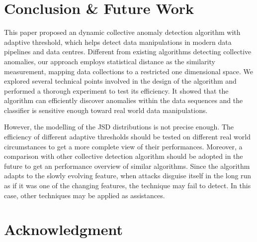 \documentclass[10pt,conference,letterpaper]{IEEEtran}
\begin{document}
	\section{Conclusion \& Future Work}\label{sec:conclusion}
		This paper proposed an dynamic collective anomaly detection algorithm with adaptive threshold, which helps detect data manipulations in modern data pipelines and data centres. Different from existing algorithms detecting collective anomalies, our approach employs statistical distance as the similarity measurement, mapping data collections to a restricted one dimensional space. We explored several technical points involved in the design of the algorithm and performed a thorough experiment to test its efficiency. It showed that the algorithm can efficiently discover anomalies within the data sequences and the classifier is sensitive enough toward real world data manipulations.
		
		However, the modelling of the JSD distributions is not precise enough. The efficiency of different adaptive thresholds should be tested on different real world circumstances to get a more complete view of their performances. Moreover, a comparison with other collective detection algorithm should be adopted in the future to get an performance overview of similar algorithms. Since the algorithm adapts to the slowly evolving feature, when attacks disguise itself in the long run as if it was one of the changing features, the technique may fail to detect. In this case, other techniques may be applied as assistances.
		

\section*{Acknowledgment}





\end{document}
